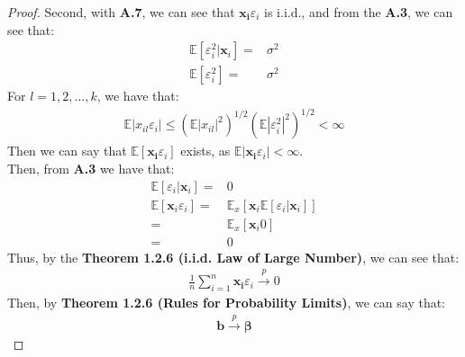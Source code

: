 \documentclass{article}
\begin{document}
\begin{proof}
			Second, with \textbf{A.7}, we can see that $\boldsymbol{x_i} \varepsilon_i$ is i.i.d., and from the \textbf{A.3}, we can see that:
				\begin{align*}
					\mathbb{E}[\varepsilon^2_i | \boldsymbol{x}_i] = &\sigma^2\\
					\mathbb{E}[\varepsilon^2_i] = &\sigma^2
				\end{align*}
			For $l = 1, 2, \ldots, k$, we have that:
				\begin{align*}
					\mathbb{E}|x_{il}\varepsilon_i| \leq (\mathbb{E}|x_{il}|^2)^{1/2} (\mathbb{E}|\varepsilon^2_i|^2)^{1/2} < \infty
				\end{align*}
			Then we can say that $\mathbb{E}[\boldsymbol{x_i}\varepsilon_i]$ exists, as $\mathbb{E}|\boldsymbol{x_i}\varepsilon_i| < \infty$.\\
			Then, from \textbf{A.3} we have that:
				\begin{align*}
					\mathbb{E}[\varepsilon_i | \boldsymbol{x}_i] = &0\\
					\mathbb{E}[\boldsymbol{x}_i \varepsilon_i] = &\mathbb{E}_x[\boldsymbol{x}_i \mathbb{E}[\varepsilon_i | \boldsymbol{x}_i]]\\
					= &\mathbb{E}_x[\boldsymbol{x}_i 0]\\
					= &0
				\end{align*} 
				Thus, by the \textbf{Theorem 1.2.6 (i.i.d. Law of Large Number)}, we can see that:
					\begin{align*}
						\frac{1}{n} \sum\limits^n_{i=1} \boldsymbol{x_i} \varepsilon_i \xrightarrow{p} 0
					\end{align*}
				Then, by \textbf{Theorem 1.2.6 (Rules for Probability Limits)}, we can say that:
					\begin{align*}
						\boldsymbol{b} \xrightarrow{p} \boldsymbol{\beta}
					\end{align*}
	\end{proof}
\end{document}
